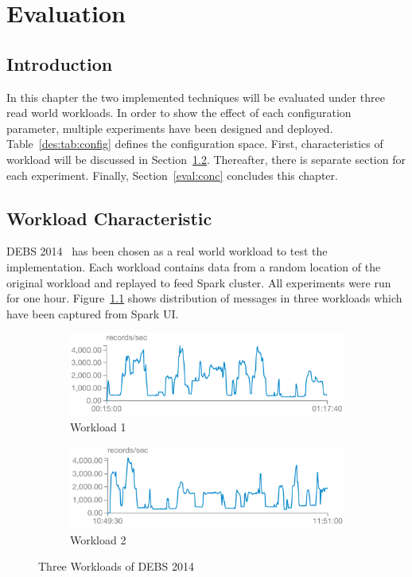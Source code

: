 \chapter{Evaluation}
\label{eval}

\section{Introduction}
In this chapter the two implemented techniques will be evaluated under three read world workloads. In order to show the effect of each configuration parameter, multiple experiments have been designed and deployed. Table~\ref{des:tab:config} defines the configuration space. First, characteristics of workload will be discussed in Section~\ref{eval:workload}. Thereafter, there is separate section for each experiment. Finally, Section~\ref{eval:conc} concludes this chapter.

\section{Workload Characteristic}
\label{eval:workload}

DEBS 2014~\cite{debs2014} has been chosen as a real world workload to test the implementation. Each workload contains data from a random location of the original workload and replayed to feed Spark cluster. All experiments were run for one hour. Figure~\ref{eval:fig:workload} shows distribution of messages in three workloads which have been captured from Spark UI.
\begin{figure}
    \centering
      \begin{subfigure}[h]{\linewidth}
        \centering\includegraphics[scale=0.6]{workload1.png}
        \caption{Workload 1}
    \end{subfigure}
    \begin{subfigure}[h]{\linewidth}
        \centering\includegraphics[scale=0.6]{workload2.png}
        \caption{Workload 2}
    \end{subfigure}
    \caption{Three Workloads of DEBS 2014}
    \label{eval:fig:workload}
\end{figure}

